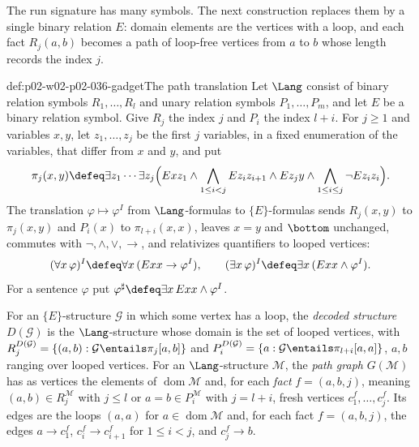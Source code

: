 The run signature has many symbols.  The next construction replaces them by a
single binary relation \(E\): domain elements are the vertices with a loop,
and each fact \(R_j(a,b)\) becomes a path of loop-free vertices from \(a\) to
\(b\) whose length records the index \(j\).

\begin{hbdefinition}{def:p02-w02-p02-036-gadget}{The path translation}
Let \(\Lang\) consist of binary relation symbols \(R_1,\ldots,R_l\) and unary
relation symbols \(P_1,\ldots,P_m\), and let \(E\) be a binary relation
symbol.  Give \(R_j\) the index \(j\) and \(P_i\) the index \(l+i\).  For
\(j\geq1\) and variables \(x,y\), let \(z_1,\ldots,z_j\) be the first \(j\)
variables, in a fixed enumeration of the variables, that differ from \(x\) and
\(y\), and put
\[
 \pi_j(x,y)\defeq\exists z_1\cdots\exists z_j\Bigl(Exz_1\land
 \bigwedge_{1\leq i<j}Ez_iz_{i+1}\land Ez_jy\land
 \bigwedge_{1\leq i\leq j}\neg Ez_iz_i\Bigr).
\]
The translation \(\varphi\mapsto\varphi^{I}\) from \(\Lang\)-formulas to
\(\{E\}\)-formulas sends \(R_j(x,y)\) to \(\pi_j(x,y)\) and \(P_i(x)\) to
\(\pi_{l+i}(x,x)\), leaves \(x=y\) and \(\bottom\) unchanged, commutes with
\(\neg,\land,\lor,\to\), and relativizes quantifiers to looped vertices:
\[
 (\forall x\,\varphi)^{I}\defeq\forall x\,(Exx\to\varphi^{I}),\qquad
 (\exists x\,\varphi)^{I}\defeq\exists x\,(Exx\land\varphi^{I}).
\]
For a sentence \(\varphi\) put
\(\varphi^{\sharp}\defeq\exists x\,Exx\land\varphi^{I}\).

For an \(\{E\}\)-structure \(\mathcal G\) in which some vertex has a loop, the
\emph{decoded structure} \(D(\mathcal G)\) is the \(\Lang\)-structure whose
domain is the set of looped vertices, with
\(R_j^{D(\mathcal G)}=\{(a,b):\mathcal G\entails\pi_j[a,b]\}\) and
\(P_i^{D(\mathcal G)}=\{a:\mathcal G\entails\pi_{l+i}[a,a]\}\), \(a,b\) ranging
over looped vertices.  For an \(\Lang\)-structure \(\mathcal M\), the
\emph{path graph} \(G(\mathcal M)\) has as vertices the elements of
\(\operatorname{dom}\mathcal M\) and, for each \emph{fact}
\(f=(a,b,j)\), meaning \((a,b)\in R_j^{\mathcal M}\) with \(j\leq l\) or
\(a=b\in P_i^{\mathcal M}\) with \(j=l+i\), fresh vertices
\(c^f_1,\ldots,c^f_j\).  Its edges are the loops \((a,a)\) for
\(a\in\operatorname{dom}\mathcal M\) and, for each fact \(f=(a,b,j)\), the
edges \(a\to c^f_1\), \(c^f_i\to c^f_{i+1}\) for \(1\leq i<j\), and
\(c^f_j\to b\).
\end{hbdefinition}

